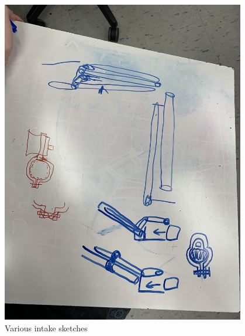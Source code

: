 \begin{figure}[ht]
\centering
\begin{minipage}[b]{.48\textwidth}
  \centering
  \includegraphics[width=0.95\textwidth]{Meetings/November/11-17-21/11-17-21_Hardware_Figure1 - Nathan Forrer.JPG}
  \caption{Various intake sketches}
  \label{fig:111721_1}
\end{minipage}%
\hfill%
\begin{minipage}[b]{.48\textwidth}
  \centering

\end{minipage}
\end{figure}

